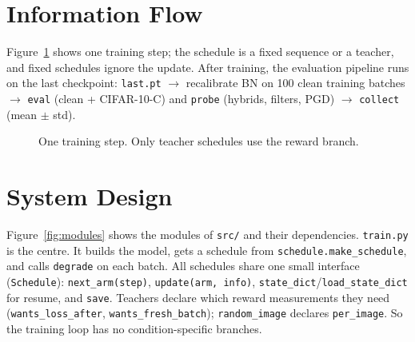 \documentclass[a4paper,12pt]{report}
\newcommand{\cond}[1]{\texttt{#1}}
\begin{document}
\section{Information Flow}

Figure~\ref{fig:flow} shows one training step; the schedule is a fixed sequence or a teacher, and fixed schedules ignore the update. After training, the evaluation pipeline runs on the last checkpoint: \texttt{last.pt} $\to$ recalibrate BN on 100 clean training batches $\to$ \texttt{eval} (clean + CIFAR-10-C) and \texttt{probe} (hybrids, filters, PGD) $\to$ \texttt{collect} (mean $\pm$ std).

\begin{figure}[htbp]
\centering
{}

\caption{One training step. Only teacher schedules use the reward branch.}
\label{fig:flow}
\end{figure}

\section{System Design}

{\sloppy Figure~\ref{fig:modules} shows the modules of \texttt{src/} and their dependencies. \texttt{train.py} is the centre. It builds the model, gets a schedule from \texttt{schedule.make\_schedule}, and calls \texttt{degrade} on each batch. All schedules share one small interface (\texttt{Schedule}): \texttt{next\_arm(step)}, \texttt{update(arm, info)}, \texttt{state\_dict}/\texttt{load\_state\_dict} for resume, and \texttt{save}. Teachers declare which reward measurements they need (\texttt{wants\_loss\_after}, \texttt{wants\_fresh\_batch}); \cond{random\_image} declares \texttt{per\_image}. So the training loop has no condition-specific branches.\par}
\end{document}
